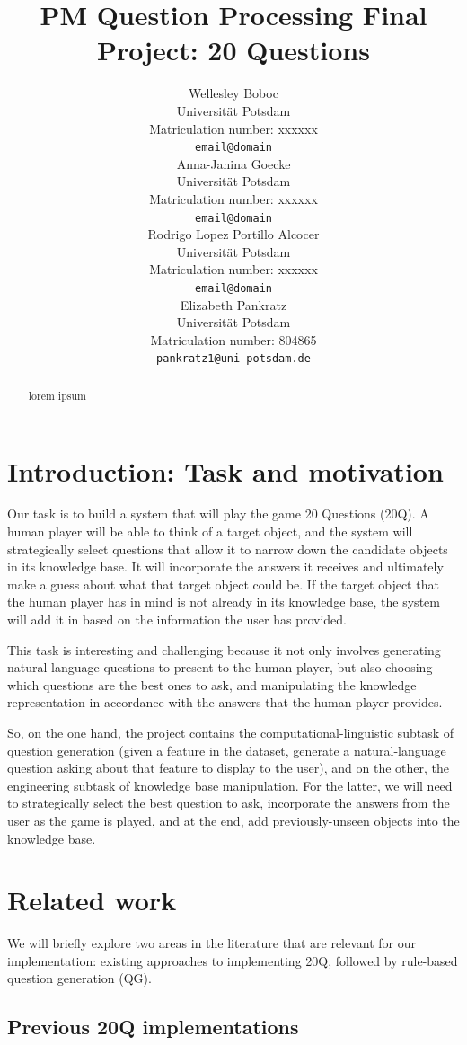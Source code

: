 \documentclass[11pt,a4paper]{article}
\title{PM Question Processing Final Project: 20 Questions}
\author{Wellesley Boboc \\
Universit{\"a}t Potsdam \\
Matriculation number: xxxxxx \\
\texttt{email@domain} \\\And
Anna-Janina Goecke \\
Universit{\"a}t Potsdam \\
Matriculation number: xxxxxx \\
\texttt{email@domain} \\\AND
Rodrigo Lopez Portillo Alcocer \\
Universit{\"a}t Potsdam \\
Matriculation number: xxxxxx \\
\texttt{email@domain} \\\And
Elizabeth Pankratz \\
Universit{\"a}t Potsdam \\
Matriculation number: 804865 \\
\texttt{pankratz1@uni-potsdam.de} \\}
\date{}
\begin{document}
\maketitle

\begin{abstract}
lorem ipsum
\end{abstract}

\section{Introduction: Task and motivation}
\label{sec:intro}

Our task is to build a system that will play the game 20 Questions (20Q).
A human player will be able to think of a target object, and the system will strategically select questions that allow it to narrow down the candidate objects in its knowledge base.
It will incorporate the answers it receives and ultimately make a guess about what that target object could be.
If the target object that the human player has in mind is not already in its knowledge base, the system will add it in based on the information the user has provided.

This task is interesting and challenging because it not only involves generating natural-language questions to present to the human player, but also choosing which questions are the best ones to ask, and manipulating the knowledge representation in accordance with the answers that the human player provides.

So, on the one hand, the project contains the computational-linguistic subtask of question generation (given a feature in the dataset, generate a natural-language question asking about that feature to display to the user), and on the other, the engineering subtask of knowledge base manipulation.
For the latter, we will need to strategically select the best question to ask, incorporate the answers from the user as the game is played, and at the end, add previously-unseen objects into the knowledge base.

\section{Related work}
\label{sec:litreview}

We will briefly explore two areas in the literature that are relevant for our implementation: existing approaches to implementing 20Q, followed by rule-based question generation (QG).

\subsection{Previous 20Q implementations}
\label{subsec:prev20q}
\end{document}
